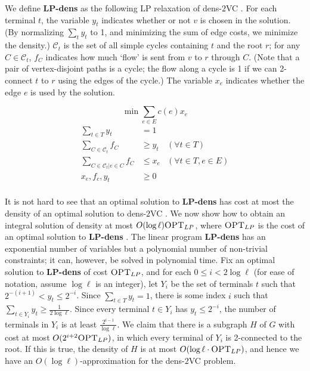 \documentclass[11pt]{article}
\newcommand{\densV}{dens-$2${\sc VC} }
\newcommand{\densLP}{{\bf LP-dens} }
\newcommand{\opt}{\textrm{\sc OPT}}
\newcommand{\script}[1]{\mathcal{#1}}
\begin{document}
\bigskip
We define \densLP as the following LP relaxation of \densV. For each
terminal $t$, the variable $y_t$ indicates whether or not $v$ is
chosen in the solution. (By normalizing $\sum_t y_t$ to 1, and
minimizing the sum of edge costs, we minimize the density.)
$\script{C}_t$ is the set of all simple cycles containing $t$ and the
root $r$; for any $C \in \script{C}_t$, $f_C$ indicates how much
`flow' is sent from $v$ to $r$ through $C$. (Note that a pair of
vertex-disjoint paths is a cycle; the flow along a cycle is 1 if we
can 2-connect $t$ to $r$ using the edges of the cycle.) The variable
$x_e$ indicates whether the edge $e$ is used by the solution.

\newpage
\[\min \sum_{e \in E} c(e) x_e \]
\vspace{-0.15in}
\begin{align*}
  \sum_{t \in T}y_t & = 1 & \\
  \sum_{C \in \script{C}_t}f_C & \ge y_t & \left( \forall t \in T \right) \\
  \sum_{C \in \script{C}_t| e \in C} f_C & \le x_e & \left( \forall t \in T, e  \in E \right) \\
  x_e, f_c, y_t & \ge 0 & \\
\end{align*}

\vspace{-0.15in}
It is not hard to see that an optimal solution to \densLP has cost at
most the density of an optimal solution to \densV. We now show how to
obtain an integral solution of density at most $O(\log \ell)
\opt_{LP}$, where $\opt_{LP}$ is the cost of an optimal solution to
\densLP.  The linear program \densLP has an exponential number of
variables but a polynomial number of non-trivial constraints; it can,
however, be solved in polynomial time. Fix an optimal solution to
\densLP of cost $\opt_{LP}$, and for each $0 \le i < 2 \log \ell$ (for
ease of notation, assume $\log \ell$ is an integer), let $Y_i$ be the
set of terminals $t$ such that $2^{-(i+1)} < y_t \le 2^{-i}$. Since
$\sum_{t \in T}y_t = 1$, there is some index $i$ such that $\sum_{t
  \in Y_i}y_t \ge \frac{1}{2 \log \ell}$. Since every terminal $t \in
Y_i$ has $y_t \le 2^{-i}$, the number of terminals in $Y_i$ is at
least $\frac{2^{i-1}}{\log \ell}$.  We claim that there is a subgraph
$H$ of $G$ with cost at most $O(2^{i+2} \opt_{LP})$, in which every
terminal of $Y_i$ is 2-connected to the root. If this is true, the
density of $H$ is at most $O(\log \ell \cdot \opt_{LP})$, and hence we
have an $O(\log \ell)$-approximation for the \densV problem.
\end{document}
